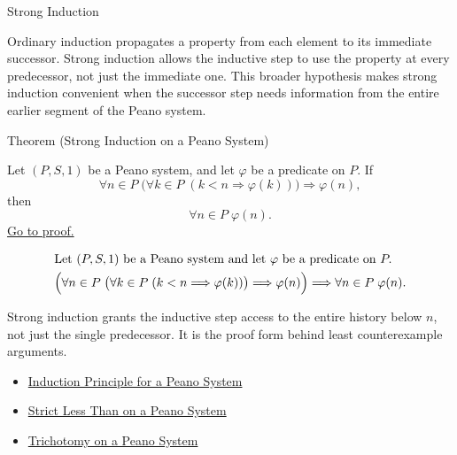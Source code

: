 \begin{topicbox}{Strong Induction}
\begin{exposition}
Ordinary induction propagates a property from each element to its immediate
successor. Strong induction allows the inductive step to use the property at
every predecessor, not just the immediate one. This broader hypothesis makes
strong induction convenient when the successor step needs information from the
entire earlier segment of the Peano system.
\end{exposition}

\begin{theorembox}{Theorem (Strong Induction on a Peano System)}
\begin{theorem}
\label{thm:strong-induction-on-peano-system}
Let $(P,S,1)$ be a Peano system, and let $\varphi$ be a predicate on $P$.
If
\[
\forall n \in P\;
\bigl(\forall k \in P\;(k < n \Longrightarrow \varphi(k))\bigr)
\Longrightarrow \varphi(n),
\]
then
\[
\forall n \in P\;\varphi(n).
\]
\hyperref[prf:strong-induction-on-peano-system]{Go to proof.}
\end{theorem}
\end{theorembox}

\begin{remark*}
\[
\begin{aligned}
&\text{Let } (P,S,1) \text{ be a Peano system and let } \varphi
\text{ be a predicate on } P.\\
&\Bigl(\forall n \in P\;
\bigl(\forall k \in P\;(k < n \Longrightarrow \varphi(k))\bigr)
\Longrightarrow \varphi(n)\Bigr)
\Longrightarrow
\forall n \in P\;\varphi(n).
\end{aligned}
\]
\end{remark*}

\begin{remark*}[Interpretation]
Strong induction grants the inductive step access to the entire history below
$n$, not just the single predecessor. It is the proof form behind least
counterexample arguments.
\end{remark*}

\begin{dependencies}
\begin{itemize}
  \item \hyperref[thm:induction-principle-for-peano-system]{Induction Principle for a Peano System}
  \item \hyperref[def:strict-less-than-on-peano-system]{Strict Less Than on a Peano System}
  \item \hyperref[thm:trichotomy-on-peano-system]{Trichotomy on a Peano System}
\end{itemize}
\end{dependencies}
\end{topicbox}


